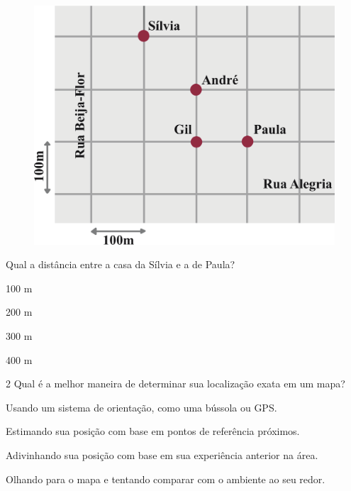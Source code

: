\begin{figure}[htpb!]
\centering
\includegraphics[width=\textwidth]{./ilustras-mat/modulo_12-treino_1.png}
\end{figure}

Qual a distância entre a casa da Sílvia e a de Paula?

\begin{escolha}

  \item 100 m

  \item 200 m

  \item 300 m

  \item 400 m

\end{escolha}

\pagebreak
\num{2} Qual é a melhor maneira de determinar sua localização exata em um
mapa? 

\begin{escolha}

  \item Usando um sistema de orientação, como uma bússola ou GPS. 

  \item Estimando sua posição com base em pontos de referência próximos. 

  \item Adivinhando sua posição com base em sua experiência anterior na área. 

  \item Olhando para o mapa e tentando comparar com o ambiente ao seu redor.

\end{escolha}

